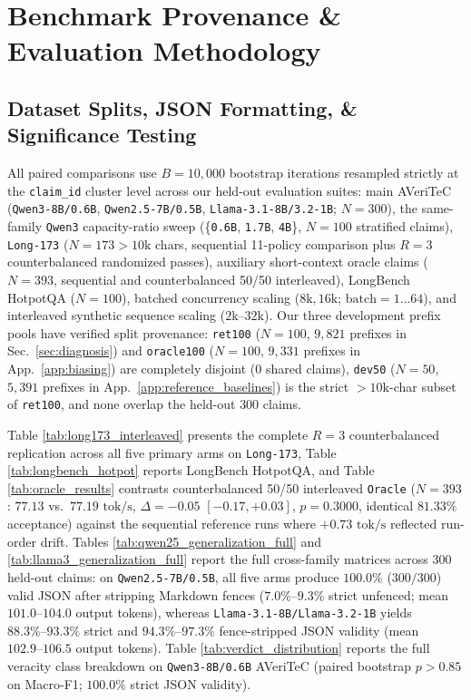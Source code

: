 \documentclass[11pt]{article}
\begin{document}
\section{Benchmark Provenance \& Evaluation Methodology}
\label{app:provenance}

\subsection{Dataset Splits, JSON Formatting, \& Significance Testing}
All paired comparisons use $B = 10,000$ bootstrap iterations resampled strictly at the \texttt{claim\_id} cluster level across our held-out evaluation suites: main AVeriTeC (\texttt{Qwen3-8B/0.6B}, \texttt{Qwen2.5-7B/0.5B}, \texttt{Llama-3.1-8B/3.2-1B}; $N=300$), the same-family \texttt{Qwen3} capacity-ratio sweep (\{\texttt{0.6B}, \texttt{1.7B}, \texttt{4B}\}, $N=100$ stratified claims), \texttt{Long-173} ($N=173 >10\text{k}$ chars, sequential 11-policy comparison plus $R=3$ counterbalanced randomized passes), auxiliary short-context oracle claims ($N=393$, sequential and counterbalanced 50/50 interleaved), LongBench HotpotQA ($N=100$), batched concurrency scaling ($8\text{k}, 16\text{k}$; $\text{batch}=1\dots 64$), and interleaved synthetic sequence scaling ($2\text{k}$--$32\text{k}$). Our three development prefix pools have verified split provenance: \texttt{ret100} ($N=100$, $9,821$ prefixes in Sec.\ \ref{sec:diagnosis}) and \texttt{oracle100} ($N=100$, $9,331$ prefixes in App.\ \ref{app:biasing}) are completely disjoint ($0$ shared claims), \texttt{dev50} ($N=50$, $5,391$ prefixes in App.\ \ref{app:reference_baselines}) is the strict $>10\text{k}$-char subset of \texttt{ret100}, and none overlap the held-out $300$ claims.

Table \ref{tab:long173_interleaved} presents the complete $R=3$ counterbalanced replication across all five primary arms on \texttt{Long-173}, Table \ref{tab:longbench_hotpot} reports LongBench HotpotQA, and Table \ref{tab:oracle_results} contrasts counterbalanced 50/50 interleaved \texttt{Oracle} ($N=393$: $77.13$ vs.\ $77.19\text{ tok/s}$, $\Delta=-0.05$ $[-0.17, +0.03]$, $p=0.3000$, identical $81.33\%$ acceptance) against the sequential reference runs where $+0.73\text{ tok/s}$ reflected run-order drift. Tables \ref{tab:qwen25_generalization_full} and \ref{tab:llama3_generalization_full} report the full cross-family matrices across 300 held-out claims: on \texttt{Qwen2.5-7B/0.5B}, all five arms produce $100.0\%$ ($300/300$) valid JSON after stripping Markdown fences ($7.0\%\text{--}9.3\%$ strict unfenced; mean $101.0\text{--}104.0$ output tokens), whereas \texttt{Llama-3.1-8B/Llama-3.2-1B} yields $88.3\%\text{--}93.3\%$ strict and $94.3\%\text{--}97.3\%$ fence-stripped JSON validity (mean $102.9\text{--}106.5$ output tokens). Table \ref{tab:verdict_distribution} reports the full veracity class breakdown on \texttt{Qwen3-8B/0.6B} AVeriTeC (paired bootstrap $p > 0.85$ on Macro-F1; $100.0\%$ strict JSON validity).
\end{document}
